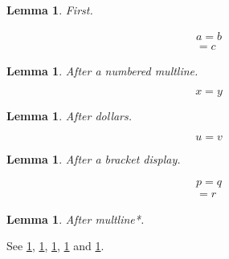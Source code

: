 \documentclass{article}
\newtheorem{lemma}[theorem]{Lemma}
\begin{document}
\begin{lemma}\label{l:a}First.\end{lemma}
\begin{multline}
a = b \\ = c
\end{multline}
\begin{lemma}\label{l:b}After a numbered multline.\end{lemma}
$$ x = y $$
\begin{lemma}\label{l:c}After dollars.\end{lemma}
\[ u = v \]
\begin{lemma}\label{l:d}After a bracket display.\end{lemma}
\begin{multline*}
p = q \\ = r
\end{multline*}
\begin{lemma}\label{l:e}After multline*.\end{lemma}
See \cref{l:a}, \cref{l:b}, \cref{l:c}, \cref{l:d} and \cref{l:e}.
\end{document}
